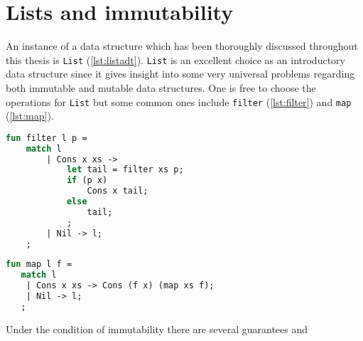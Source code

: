 
\section{Lists and immutability}
An instance of a data structure which has been thoroughly discussed throughout this thesis is \texttt{List} (\autoref{lst:listadt}).
\texttt{List} is an excellent choice as an introductory data structure since it gives insight into some very universal problems regarding both immutable and mutable data structures.
One is free to choose the operations for \texttt{List} but some common ones include \texttt{filter} (\autoref{lst:filter}) and \texttt{map} (\autoref{lst:map}).
\begin{lstlisting}[float,language=ML,caption={Filtering some \texttt{l:List a} based on a predicate p},label={lst:filter},mathescape=true]
fun filter l p = 
    match l
        | Cons x xs -> 
            let tail = filter xs p;
            if (p x)
                Cons x tail;
            else
                tail;
            ;
        | Nil -> l;
    ;
\end{lstlisting}
\begin{lstlisting}[float,language=ML,caption={Mapping from \texttt{List a} to \texttt{List b}},label={lst:map},mathescape=true]
fun map l f = 
   match l
    | Cons x xs -> Cons (f x) (map xs f);
    | Nil -> l;
   ;
\end{lstlisting}
Under the condition of immutability there are several guarantees and 

